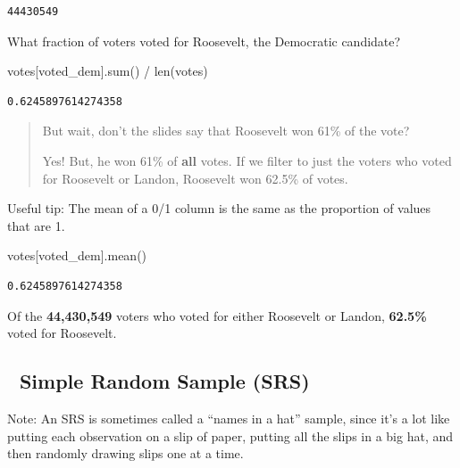 \documentclass[
  letterpaper,
  DIV=11,
  numbers=noendperiod]{scrreprt}
\newenvironment{Shaded}{\begin{snugshade}}{\end{snugshade}}
\newcommand{\BuiltInTok}[1]{\textcolor[rgb]{0.00,0.23,0.31}{#1}}
\newcommand{\NormalTok}[1]{\textcolor[rgb]{0.00,0.23,0.31}{#1}}
\newcommand{\OperatorTok}[1]{\textcolor[rgb]{0.37,0.37,0.37}{#1}}
\newcommand{\StringTok}[1]{\textcolor[rgb]{0.13,0.47,0.30}{#1}}
\begin{document}
\begin{verbatim}
44430549
\end{verbatim}

What fraction of voters voted for Roosevelt, the Democratic candidate?

\begin{Shaded}
\begin{Highlighting}[]
\NormalTok{votes[}\StringTok{\textquotesingle{}voted\_dem\textquotesingle{}}\NormalTok{].}\BuiltInTok{sum}\NormalTok{() }\OperatorTok{/} \BuiltInTok{len}\NormalTok{(votes)}
\end{Highlighting}
\end{Shaded}

\begin{verbatim}
0.6245897614274358
\end{verbatim}

\begin{quote}
But wait, don't the slides say that Roosevelt won 61\% of the vote?

Yes! But, he won 61\% of \textbf{all} votes. If we filter to just the
voters who voted for Roosevelt or Landon, Roosevelt won 62.5\% of votes.
\end{quote}

Useful tip: The mean of a 0/1 column is the same as the proportion of
values that are 1.

\begin{Shaded}
\begin{Highlighting}[]
\NormalTok{votes[}\StringTok{\textquotesingle{}voted\_dem\textquotesingle{}}\NormalTok{].mean()}
\end{Highlighting}
\end{Shaded}

\begin{verbatim}
0.6245897614274358
\end{verbatim}

Of the \textbf{44,430,549} voters who voted for either Roosevelt or
Landon, \textbf{62.5\%} voted for Roosevelt.

\subsection{🎩 Simple Random Sample
(SRS)}\label{simple-random-sample-srs}

Note: An SRS is sometimes called a ``names in a hat'' sample, since it's
a lot like putting each observation on a slip of paper, putting all the
slips in a big hat, and then randomly drawing slips one at a time.
\end{document}
